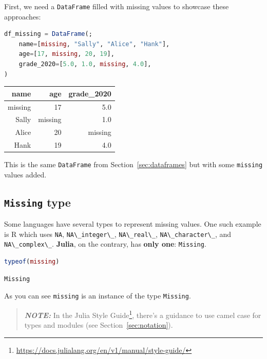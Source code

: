 \documentclass[
  notoc %
]{tufte-book}
\DeclareRobustCommand{\href}[2]{#2\footnote{\url{#1}}}
\newcommand{\passthrough}[1]{#1}
\begin{document}
First, we need a \passthrough{\lstinline!DataFrame!} filled with missing
values to showcase these approaches:

\begin{lstlisting}[language=Julia]
df_missing = DataFrame(;
    name=[missing, "Sally", "Alice", "Hank"],
    age=[17, missing, 20, 19],
    grade_2020=[5.0, 1.0, missing, 4.0],
)
\end{lstlisting}

\begin{longtable}[]{@{}rrr@{}}
\toprule
name & age & grade\_2020 \\
\midrule
\endhead
missing & 17 & 5.0 \\
Sally & missing & 1.0 \\
Alice & 20 & missing \\
Hank & 19 & 4.0 \\
\bottomrule
\end{longtable}

This is the same \passthrough{\lstinline!DataFrame!} from
Section~\ref{sec:dataframes} but with some
\passthrough{\lstinline!missing!} values added.

\hypertarget{sec:missing_type}{%
\subsection{\texorpdfstring{\texttt{Missing}
type}{Missing type}}\label{sec:missing_type}}

Some languages have several types to represent missing values. One such
example is R which uses \passthrough{\lstinline!NA!},
\passthrough{\lstinline!NA\_integer\_!},
\passthrough{\lstinline!NA\_real\_!},
\passthrough{\lstinline!NA\_character\_!}, and
\passthrough{\lstinline!NA\_complex\_!}. \textbf{Julia}, on the
contrary, has \textbf{only one}: \passthrough{\lstinline!Missing!}.

\begin{lstlisting}[language=Julia]
typeof(missing)
\end{lstlisting}

\begin{lstlisting}[language=Output]
Missing
\end{lstlisting}

As you can see \passthrough{\lstinline!missing!} is an instance of the
type \passthrough{\lstinline!Missing!}.

\begin{quote}
\textbf{\emph{NOTE:}} In the
\href{https://docs.julialang.org/en/v1/manual/style-guide/}{Julia Style
Guide}, there's a guidance to use camel case for types and modules (see
Section~\ref{sec:notation}).
\end{quote}
\end{document}
